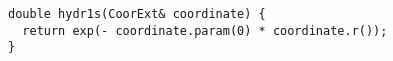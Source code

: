 \begin{verbatim}
double hydr1s(CoorExt& coordinate) {
  return exp(- coordinate.param(0) * coordinate.r());
}
\end{verbatim}
